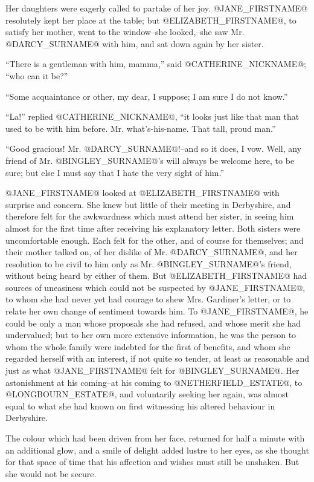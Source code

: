 Her daughters were eagerly called to partake of her joy. @JANE_FIRSTNAME@ resolutely
kept her place at the table; but @ELIZABETH_FIRSTNAME@, to satisfy her mother, went
to the window--she looked,--she saw Mr. @DARCY_SURNAME@ with him, and sat down
again by her sister.

``There is a gentleman with him, mamma,'' said @CATHERINE_NICKNAME@; ``who can it be?''

``Some acquaintance or other, my dear, I suppose; I am sure I do not
know.''

``La!'' replied @CATHERINE_NICKNAME@, ``it looks just like that man that used to be with
him before. Mr. what's-his-name. That tall, proud man.''

``Good gracious! Mr. @DARCY_SURNAME@!--and so it does, I vow. Well, any friend of
Mr. @BINGLEY_SURNAME@'s will always be welcome here, to be sure; but else I must
say that I hate the very sight of him.''

@JANE_FIRSTNAME@ looked at @ELIZABETH_FIRSTNAME@ with surprise and concern. She knew but little
of their meeting in Derbyshire, and therefore felt for the awkwardness
which must attend her sister, in seeing him almost for the first time
after receiving his explanatory letter. Both sisters were uncomfortable
enough. Each felt for the other, and of course for themselves; and their
mother talked on, of her dislike of Mr. @DARCY_SURNAME@, and her resolution to be
civil to him only as Mr. @BINGLEY_SURNAME@'s friend, without being heard by either
of them. But @ELIZABETH_FIRSTNAME@ had sources of uneasiness which could not be
suspected by @JANE_FIRSTNAME@, to whom she had never yet had courage to shew Mrs.
Gardiner's letter, or to relate her own change of sentiment towards him.
To @JANE_FIRSTNAME@, he could be only a man whose proposals she had refused,
and whose merit she had undervalued; but to her own more extensive
information, he was the person to whom the whole family were indebted
for the first of benefits, and whom she regarded herself with an
interest, if not quite so tender, at least as reasonable and just as
what @JANE_FIRSTNAME@ felt for @BINGLEY_SURNAME@. Her astonishment at his coming--at his
coming to @NETHERFIELD_ESTATE@, to @LONGBOURN_ESTATE@, and voluntarily seeking her again,
was almost equal to what she had known on first witnessing his altered
behaviour in Derbyshire.

The colour which had been driven from her face, returned for half a
minute with an additional glow, and a smile of delight added lustre to
her eyes, as she thought for that space of time that his affection and
wishes must still be unshaken. But she would not be secure.

